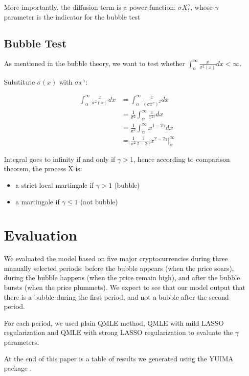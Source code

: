 \begin{spacing}{1.5}
More importantly, the diffusion term is a power function: $\sigma X_t^{\gamma}$, whose $\gamma$ parameter is the indicator for the bubble test
\subsection{Bubble Test}
As mentioned in the bubble theory, we want to test whether $\int^{\infty}_{\alpha}\frac{x}{\sigma^2(x)}dx < \infty$.

Substitute $\sigma (x)$ with $\sigma x^{\gamma}$:

\begin{equation}
\begin{aligned}
\int^{\infty}_{\alpha}\frac{x}{\sigma^2(x)}dx &= \int^{\infty}_{\alpha}\frac{x}{(\sigma x^{\gamma})^2}dx \\
&= \frac{1}{\sigma^2}\int^{\infty}_{\alpha}\frac{x}{x^{2\gamma}}dx \\
&= \frac{1}{\sigma^2}\int^{\infty}_{\alpha}x^{1-2\gamma}dx \\
&= \frac{1}{\sigma^2}\frac{1}{2-2\gamma}x^{2-2\gamma} |_{\alpha}^{\infty}
\end{aligned}
\end{equation}

Integral goes to infinity if and only if $\gamma > 1$, hence according to comparison theorem, the process X is:
\begin{itemize}
\item a strict local martingale if $\gamma > 1$ (bubble)
\item a martingale if $\gamma \le 1$ (not bubble)
\end{itemize}

\section{Evaluation}

We evaluated the model based on five major cryptocurrencies during three manually selected periods: before the bubble appears (when the price soars), during the bubble happens (when the price remain high), and after the bubble bursts (when the price plummets). We expect to see that our model output that there is a bubble during the first period, and not a bubble after the second period. 

For each period, we used plain QMLE method, QMLE with mild LASSO regularization and QMLE with strong LASSO regularization to evaluate the $\gamma$ parameters. 

At the end of this paper is a table of results we generated using the YUIMA package \cite{brouste2013parameter}. 


\end{spacing}
